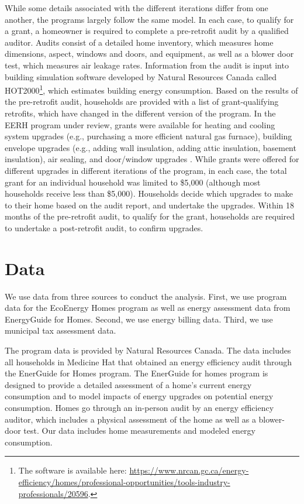 \documentclass{article}
\begin{document}
While some details associated with the different iterations differ from one another, the programs largely follow the same model. In each case, to qualify for a grant, a homeowner is required to complete a pre-retrofit audit by a qualified auditor. Audits consist of a detailed home inventory, which measures home dimensions, aspect, windows and doors, and equipment, as well as a blower door test, which measures air leakage rates. Information from the audit is input into building simulation software developed by Natural Resources Canada called HOT2000\footnote{The software is available here: \url{https://www.nrcan.gc.ca/energy-efficiency/homes/professional-opportunities/tools-industry-professionals/20596}.}, which estimates building energy consumption. Based on the results of the pre-retrofit audit, households are provided with a list of grant-qualifying retrofits, which have changed in the different version of the program. In the EERH program under review, grants were available for heating and cooling system upgrades (e.g., purchasing a more efficient natural gas furnace), building envelope upgrades (e.g., adding wall insulation, adding attic insulation, basement insulation), air sealing, and door/window upgrades \citep{canada2009granttable}. While grants were offered for different upgrades in different iterations of the program, in each case, the total grant for an individual household was limited to \$5,000 (although most households receive less than \$5,000). Households decide which upgrades to make to their home based on the audit report, and undertake the upgrades. Within 18 months of the pre-retrofit audit, to qualify for the grant, households are required to undertake a post-retrofit audit, to confirm upgrades.


\section{Data}
We use data from three sources to conduct the analysis. First, we use program data for the EcoEnergy Homes program as well as energy assessment data from EnergyGuide for Homes. Second, we use energy billing data. Third, we use municipal tax assessment data.

The program data is provided by Natural Resources Canada. The data includes all households in Medicine Hat that obtained an energy efficiency audit through the EnerGuide for Homes program. The EnerGuide for homes program is designed to provide a detailed assessment of a home's current energy consumption and to model impacts of energy upgrades on potential energy consumption. Homes go through an in-person audit by an energy efficiency auditor, which includes a physical assessment of the home as well as a blower-door test. Our data includes home measurements and modeled energy consumption.
\end{document}
